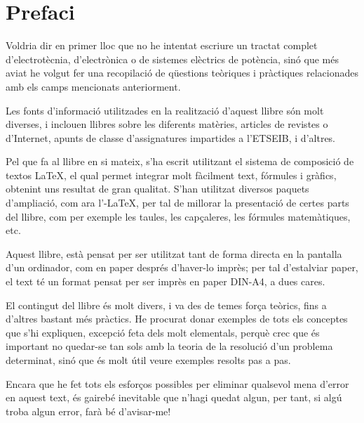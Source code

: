 \chapter*{Prefaci} 

   Voldria dir en primer lloc que no he intentat escriure un tractat complet
   d'electrot\`{e}cnia, d'electr\`{o}nica o de sistemes el\`{e}ctrics de pot\`{e}ncia, sin\'{o} que m\'{e}s aviat
   he volgut
   fer una recopilaci\'{o} de q\"{u}estions te\`{o}riques i pr\`{a}ctiques relacionades amb els camps mencionats
   anteriorment.

   Les fonts d'informaci\'{o} utilitzades en la realitzaci\'{o} d'aquest llibre s\'{o}n molt diverses,
   i inclouen llibres sobre les diferents mat\`{e}ries, articles de revistes o d'Internet,
   apunts de classe d'assignatures impartides a l'\textsf{ETSEIB}, i d'altres.

   Pel que fa al llibre en si mateix, s'ha escrit utilitzant el sistema de composici\'{o} de
   textos \LaTeX, el qual
   permet integrar molt f\`{a}cilment text, f\'{o}rmules i gr\`{a}fics, obtenint uns resultat de
   gran qualitat. S'han utilitzat diversos paquets d'ampliaci\'{o}, com ara
   l'\AmS-\LaTeX,
   per tal de millorar la presentaci\'{o} de certes parts del
   llibre, com per exemple les taules, les cap\c{c}aleres, les f\'{o}rmules matem\`{a}tiques, etc.

   Aquest llibre, est\`{a} pensat per ser utilitzat tant de forma directa en la pantalla d'un
   ordinador, com en paper despr\'{e}s d'haver-lo impr\`{e}s; per tal d'estalviar paper, el text
   t\'{e} un format pensat per ser impr\`{e}s en paper DIN-A4, a dues cares.

    El contingut del llibre \'{e}s molt divers, i va des de temes for\c{c}a te\`{o}rics, fins a
    d'altres bastant m\'{e}s pr\`{a}ctics. He procurat donar exemples de tots els conceptes
    que s'hi expliquen, excepci\'{o} feta dels molt elementals, perqu\`{e} crec que \'{e}s important
     no quedar-se tan sols amb la teoria de  la resoluci\'{o} d'un problema determinat, sin\'{o} que
     \'{e}s molt \'{u}til veure exemples resolts pas a pas.

    Encara que he fet tots els esfor\c{c}os possibles per eliminar qualsevol
    mena  d'error en aquest text, \'{e}s gaireb\'{e} inevitable que n'hagi quedat algun,
    per tant, si alg\'{u} troba algun error, far\`{a} b\'{e} d'avisar-me!


